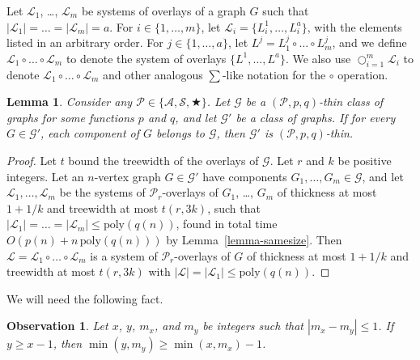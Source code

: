 \documentclass[a4paper,11pt]{article}
\newcommand{\Aa}{{\mathcal A}}
\newcommand{\GG}{{\mathcal G}}
\newcommand{\LL}{{\mathcal L}}
\newcommand{\Ss}{{\mathcal S}}
\newcommand{\PP}{{\mathcal P}}
\newcommand{\poly}{\text{poly}}
\newtheorem{lemma}[theorem]{Lemma}
\newtheorem{observation}[theorem]{Observation}
\begin{document}
Let $\LL_1$, \ldots, $\LL_m$ be systems of overlays of a graph $G$ such that $|\LL_1|=\ldots=|\LL_m|=a$.
For $i\in\{1,\ldots,m\}$, let $\LL_i=\{L_i^1,\ldots,L_i^a\}$, with the elements listed in an arbitrary order. For $j\in\{1,\ldots,a\}$, let
$L^j=L_1^j\circ\ldots\circ L_m^j$, and we define $\LL_1\circ\ldots\circ\LL_m$ to denote the system of overlays $\{L^1,\ldots, L^a\}$.
We also use $\bigcirc_{i=1}^m\LL_i$ to denote $\LL_1\circ\ldots\circ\LL_m$ and other analogous $\sum$-like notation for the $\circ$ operation.

\begin{lemma}\label{lemma-comp}
Consider any $\PP\in\{\Aa,\Ss,\bigstar\}$.
Let $\GG$ be a $(\PP,p,q)$-thin class of graphs for some functions $p$ and $q$,
and let $\GG'$ be a class of graphs.  If for every $G\in\GG'$, each component of $G$ belongs to $\GG$,
then $\GG'$ is $(\PP,p,q)$-thin.
\end{lemma}
\begin{proof}
Let $t$ bound the treewidth of the overlays of $\GG$.
Let $r$ and $k$ be positive integers.  Let an $n$-vertex graph $G\in\GG'$ have components $G_1, \ldots, G_m\in \GG$,
and let $\LL_1,\ldots,\LL_m$ be the systems of $\PP_r$-overlays of $G_1$, \ldots, $G_m$
of thickness at most $1+1/k$ and
treewidth at most $t(r,3k)$, such that $|\LL_1|=\ldots=|\LL_m|\le \poly(q(n))$, found in
total time $O(p(n)+n\,\poly(q(n)))$ by Lemma~\ref{lemma-samesize}.
Then $\LL=\LL_1\circ\ldots\circ\LL_m$ is a system of $\PP_r$-overlays of $G$ of
thickness at most $1+1/k$ and treewidth at most $t(r,3k)$ with $|\LL|=|\LL_1|\le\poly(q(n))$.
\end{proof}

We will need the following fact.
\begin{observation}\label{obs-cutoff}
Let $x$, $y$, $m_x$, and $m_y$ be integers such that $|m_x-m_y|\le 1$.
If $y\ge x-1$, then $\min(y,m_y)\ge\min(x,m_x)-1$.
\end{observation}
\end{document}
